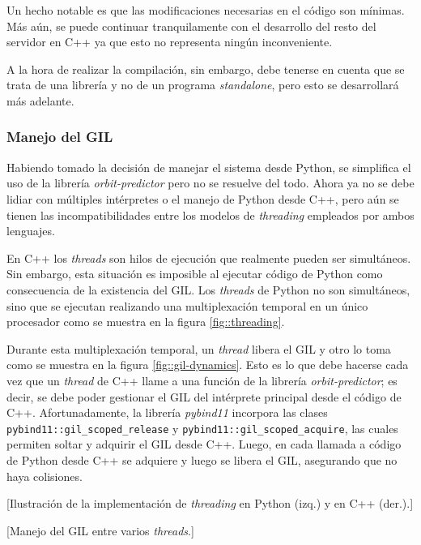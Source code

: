 \documentclass[../../main.tex]{subfiles}
\begin{document}
Un hecho notable es que las modificaciones necesarias en el código son mínimas. Más aún, se puede continuar tranquilamente con el desarrollo del resto del servidor en C++ ya que esto no representa ningún inconveniente. 

A la hora de realizar la compilación, sin embargo, debe tenerse en cuenta que se trata de una librería y no de un programa \textit{standalone}, pero esto se desarrollará más adelante.

\subsubsection{Manejo del GIL}
Habiendo tomado la decisión de manejar el sistema desde Python, se simplifica el uso de la librería \textit{orbit-predictor} pero no se resuelve del todo. Ahora ya no se debe lidiar con múltiples intérpretes o el manejo de Python desde C++, pero aún se tienen las incompatibilidades entre los modelos de \textit{threading} empleados por ambos lenguajes.

En C++ los \textit{threads} son hilos de ejecución que realmente pueden ser simultáneos. Sin embargo, esta situación es imposible al ejecutar código de Python como consecuencia de la existencia del GIL. Los \textit{threads} de Python no son simultáneos, sino que se ejecutan realizando una multiplexación temporal en un único procesador como se muestra en la figura \ref{fig::threading}.

Durante esta multiplexación temporal, un \textit{thread} libera el GIL y otro lo toma como se muestra en la figura \ref{fig::gil-dynamics}. Esto es lo que debe hacerse cada vez que un \textit{thread} de C++ llame a una función de la librería \textit{orbit-predictor}; es decir, se debe poder gestionar el GIL del intérprete principal desde el código de C++. 
Afortunadamente, la librería \textit{pybind11} incorpora las clases \texttt{pybind11::gil\_scoped\_release} y \texttt{pybind11::gil\_scoped\_acquire}, las cuales permiten soltar y adquirir el GIL desde C++. Luego, en cada llamada a código de Python desde C++ se adquiere y luego se libera el GIL, asegurando que no haya colisiones.

[Ilustración de la implementación de \textit{threading} en Python (izq.) y en C++ (der.).]

[Manejo del GIL entre varios \textit{threads}.]
\end{document}
